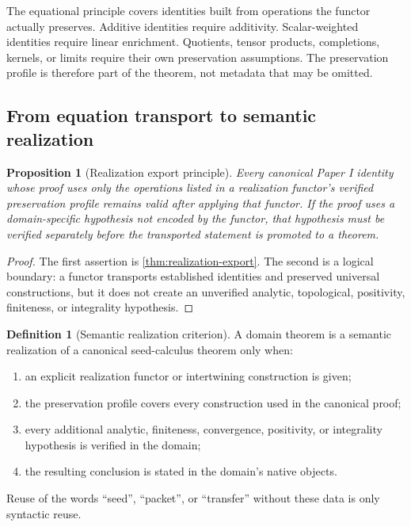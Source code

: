 \documentclass[11pt]{article}
\newtheorem{proposition}[proposition]{Proposition}
\theoremstyle{definition}
\newtheorem{definition}[definition]{Definition}
\theoremstyle{remark}
\theoremstyle{definition}\newtheorem{example}[theorem]{Example}
\newcommand{\RecordID}[1]{\label{record:#1}}
\newcommand{\Depends}[1]{}
\begin{document}
\begin{interpretation}
The equational principle covers identities built from operations the functor actually preserves.  Additive identities require additivity.  Scalar-weighted identities require linear enrichment.  Quotients, tensor products, completions, kernels, or limits require their own preservation assumptions.  The preservation profile is therefore part of the theorem, not metadata that may be omitted.
\end{interpretation}


\subsection{From equation transport to semantic realization}
\begin{proposition}[Realization export principle]
\label{prop:realization-export}
Every canonical Paper I identity whose proof uses only the operations listed in a realization functor's verified preservation profile remains valid after applying that functor.  If the proof uses a domain-specific hypothesis not encoded by the functor, that hypothesis must be verified separately before the transported statement is promoted to a theorem.
\end{proposition}
\RecordID{PSC-I-P-REALIZATION-EXPORT}
\Depends{PSC-I-T-REALIZATION-EXPORT.}

\begin{proof}
The first assertion is \cref{thm:realization-export}.  The second is a logical boundary: a functor transports established identities and preserved universal constructions, but it does not create an unverified analytic, topological, positivity, finiteness, or integrality hypothesis.
\end{proof}

\begin{definition}[Semantic realization criterion]
\label{def:semantic-realization}
A domain theorem is a semantic realization of a canonical seed-calculus theorem only when:
\begin{enumerate}[label=(\roman*)]
\item an explicit realization functor or intertwining construction is given;
\item the preservation profile covers every construction used in the canonical proof;
\item every additional analytic, finiteness, convergence, positivity, or integrality hypothesis is verified in the domain;
\item the resulting conclusion is stated in the domain's native objects.
\end{enumerate}
Reuse of the words ``seed'', ``packet'', or ``transfer'' without these data is only syntactic reuse.
\end{definition}
\RecordID{PSC-I-D-SEMANTIC-REALIZATION}
\end{document}
